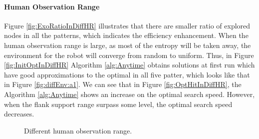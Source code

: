 \paragraph{Human Observation Range}

Figure \ref{fig:ExoRatioInDiffHR} illustrates that there are smaller ratio of explored nodes in all the patterns, which indicates the efficiency enhancement.
When the human observation range is large, as most of the entropy will be taken away, the environment for the robot will converge from random to uniform.
Thus, in Figure \ref{fig:InitOptInDiffHR} Algorithm \ref{alg:Anytime} obtains solutions at first run which have good approximations to the optimal in all five patter, which looks like that in Figure \ref{fig:diffEnv:a1}.
We can see that in Figure \ref{fig:OptHitInDiffHR}, the Algorithm \ref{alg:Anytime} shows an increase on the optimal search speed. 
However, when the flank support range surpass some level, the optimal search speed decreases.

\begin{figure}[H] 
  \centering 
  \caption{Different human observation range.} 
  \label{fig:PMdiffHR} %
\end{figure}

